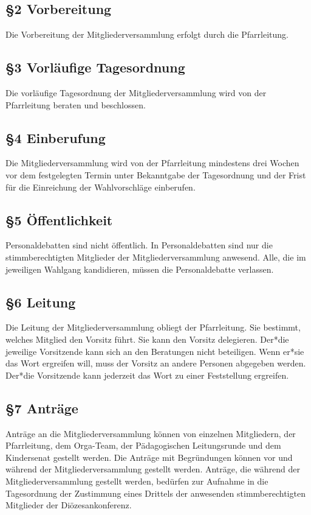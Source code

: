 \documentclass[12pt]{report}
\begin{document}
\begin{flushleft}
\subsection*{§2 Vorbereitung}
Die Vorbereitung der Mitgliederversammlung erfolgt durch die Pfarrleitung.
\subsection*{§3 Vorläufige Tagesordnung}
Die vorläufige Tagesordnung der Mitgliederversammlung wird von der Pfarrleitung beraten und beschlossen.
\subsection*{§4 Einberufung}
Die Mitgliederversammlung wird von der Pfarrleitung mindestens drei Wochen vor dem festgelegten Termin
unter Bekanntgabe der Tagesordnung und der Frist für die Einreichung der Wahlvorschläge einberufen.
\subsection*{§5 Öffentlichkeit}
Personaldebatten sind nicht öffentlich. In Personaldebatten sind nur die stimmberechtigten Mitglieder der
Mitgliederversammlung anwesend. Alle, die im jeweiligen Wahlgang kandidieren, müssen die Personaldebatte
verlassen.
\subsection*{§6 Leitung}
Die Leitung der Mitgliederversammlung obliegt der Pfarrleitung. Sie bestimmt, welches Mitglied den Vorsitz
führt. Sie kann den Vorsitz delegieren. Der*die jeweilige Vorsitzende kann sich an den Beratungen nicht
beteiligen. Wenn er*sie das Wort ergreifen will, muss der Vorsitz an andere Personen abgegeben werden.
Der*die Vorsitzende kann jederzeit das Wort zu einer Feststellung ergreifen.
\subsection*{§7 Anträge}
Anträge an die Mitgliederversammlung können von einzelnen Mitgliedern, der Pfarrleitung, dem Orga-Team,
der Pädagogischen Leitungsrunde und dem Kindersenat gestellt werden. Die Anträge mit Begründungen
können vor und während der Mitgliederversammlung gestellt werden. Anträge, die während der
Mitgliederversammlung gestellt werden, bedürfen zur Aufnahme in die Tagesordnung der Zustimmung eines Drittels
der anwesenden stimmberechtigten Mitglieder der Diözesankonferenz.


\end{flushleft}
\end{document}

